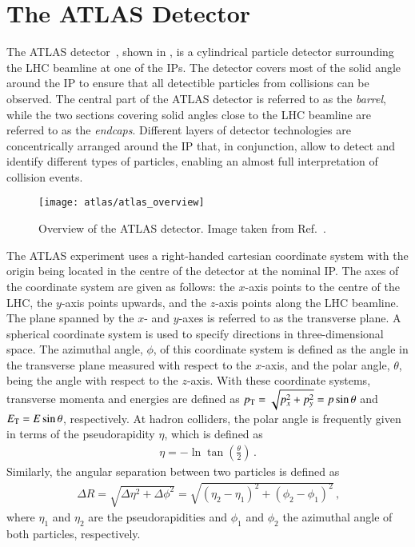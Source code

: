 \section{The ATLAS Detector}%
\label{sec:atlas}

The ATLAS detector~\cite{PERF-2007-01}, shown in
, is a cylindrical particle detector
surrounding the LHC beamline at one of the IPs. The detector covers most of the
solid angle around the IP to ensure that all detectible particles from
collisions can be observed. The central part of the ATLAS detector is referred
to as the \emph{barrel}, while the two sections covering solid angles close to
the LHC beamline are referred to as the \emph{endcaps}. Different layers of
detector technologies are concentrically arranged around the IP that, in
conjunction, allow to detect and identify different types of particles, enabling
an almost full interpretation of collision events.

\begin{figure}[htbp]
  \centering

  \texttt{[image: atlas/atlas\_overview]}

  \caption{Overview of the ATLAS detector. Image taken from
    Ref.~\cite{Pequenao:1095924}.}%
  \label{fig:atlas_detector_overview}
\end{figure}

The ATLAS experiment uses a right-handed cartesian coordinate system with the
origin being located in the centre of the detector at the nominal IP. The axes
of the coordinate system are given as follows: the $x$-axis points to the centre
of the LHC, the $y$-axis points upwards, and the $z$-axis points along the LHC
beamline. The plane spanned by the $x$- and $y$-axes is referred to as the
transverse plane. A spherical coordinate system is used to specify directions in
three-dimensional space. The azimuthal angle, $\phi$, of this coordinate system
is defined as the angle in the transverse plane measured with respect to the
$x$-axis, and the polar angle, $\theta$, being the angle with respect to the
$z$-axis. With these coordinate systems, transverse momenta and energies are
defined as $p_{\text{T}} = \sqrt{p_x^2 + p_y^2} = p \sin\theta$ and $E_{\text{T}} = E \sin\theta$,
respectively. At hadron colliders, the polar angle is frequently given in terms
of the pseudorapidity $\eta$, which is defined as
\begin{align*}
  \eta = - \ln\tan\left( \frac{\theta}{2} \right) \,\text{.}
\end{align*}
Similarly, the angular separation between two particles is defined as
\begin{align*}
  \Delta R = \sqrt{\Delta \eta^2 + \Delta \phi^2} = \sqrt{(\eta_2 - \eta_1)^2 +
  (\phi_2 - \phi_1)^2} \,\text{,}
\end{align*}
where $\eta_1$ and $\eta_2$ are the pseudorapidities and $\phi_1$ and $\phi_2$
the azimuthal angle of both particles, respectively.


